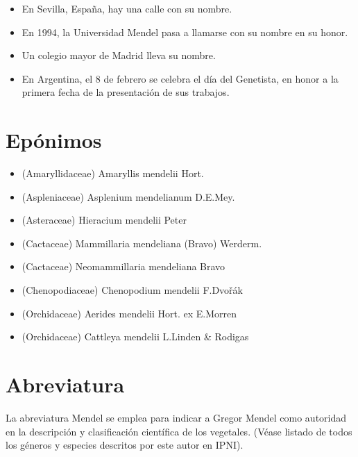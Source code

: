 \documentclass{report}
\begin{document}
\begin{itemize}
  \item En Sevilla, España, hay una calle con su nombre.
  \item En 1994, la Universidad Mendel pasa a llamarse con su nombre en su honor.
  \item Un colegio mayor de Madrid lleva su nombre.
  \item En Argentina, el 8 de febrero se celebra el día del Genetista, en honor a la primera fecha de la presentación de sus trabajos.

\end{itemize}

\chapter{Epónimos}
\begin{itemize}
  \item (Amaryllidaceae) Amaryllis mendelii Hort.
  \item (Aspleniaceae) Asplenium  mendelianum D.E.Mey.
  \item (Asteraceae) Hieracium mendelii Peter
  \item (Cactaceae) Mammillaria mendeliana (Bravo) Werderm.
  \item (Cactaceae) Neomammillaria mendeliana Bravo
  \item (Chenopodiaceae) Chenopodium  mendelii F.Dvořák
  \item (Orchidaceae) Aerides mendelii Hort. ex E.Morren
  \item (Orchidaceae) Cattleya mendelii L.Linden \& Rodigas
\end{itemize}

\chapter{Abreviatura}

La abreviatura Mendel se emplea para indicar a Gregor Mendel como autoridad en la descripción y clasificación científica de los vegetales. (Véase listado de todos los géneros y especies descritos por este autor en IPNI).



\end{document}
